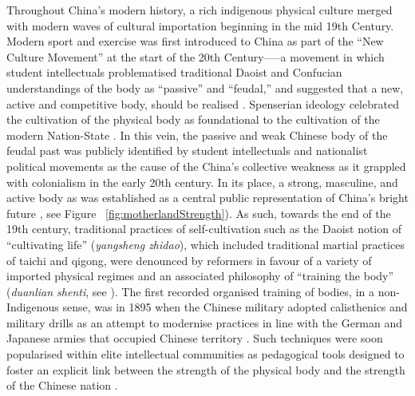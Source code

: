 Throughout China's modern history, a rich indigenous physical culture merged with modern waves of cultural importation beginning in the mid 19th Century. Modern sport and exercise was first introduced to China as part of the ``New Culture Movement'' at the start of the 20th Century—--a movement in which student intellectuals problematised traditional Daoist and Confucian understandings of the body as ``passive'' and ``feudal,'' and suggested that a new, active and competitive body, should be realised \citep{Ge2005}.  Spenserian ideology celebrated the cultivation of the physical body as foundational to the cultivation of the modern Nation-State \citep{Morris2004}. In this vein, the passive and weak Chinese body of the feudal past was publicly identified by student intellectuals and nationalist political movements as the cause of the China's collective weakness as it grappled with colonialism in the early 20th century.
In its place, a strong, masculine, and active body as was established as a central public representation of China's bright future \citep{Brownell1995}, see Figure ~\ref{fig:motherlandStrength}).  As such, towards the end of the 19th century, traditional practices of self-cultivation such as the Daoist notion of ``cultivating life'' (\textit{yangsheng zhidao}), which included traditional martial practices of taichi and qigong, were denounced by reformers in favour of a variety of imported physical regimes and an associated philosophy of ``training the body'' (\textit{duanlian shenti}, see \cite{Farquhar2012}).  The first recorded organised training of bodies, in a non-Indigenous sense, was in 1895 when the Chinese military adopted calisthenics and military drills as an attempt to modernise practices in line with the German and Japanese armies that occupied Chinese territory \citep[viii]{Knuttgen1990}.
Such techniques were soon popularised within elite intellectual communities as pedagogical tools designed to foster an explicit link between the strength of the physical body and the strength of the Chinese nation \cites[32]{Morris2004}[49]{Brownell1995}.

